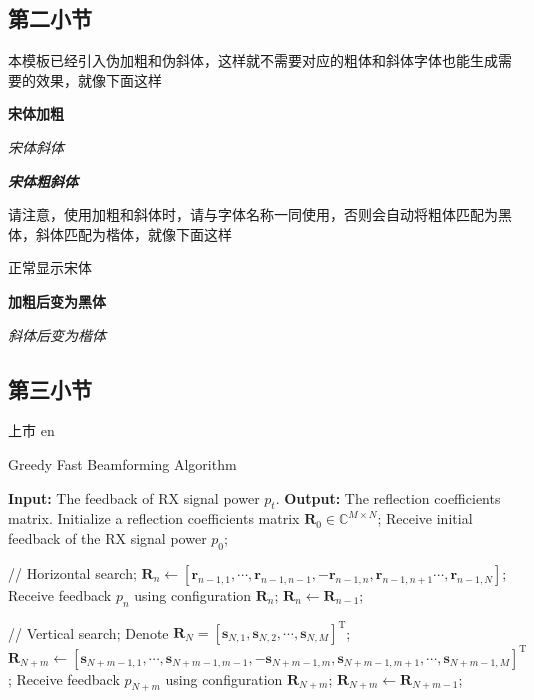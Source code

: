 \documentclass[supercite]{HustGraduPaper}
\begin{document}
	\subsection{第二小节}
	本模板已经引入伪加粗和伪斜体，这样就不需要对应的粗体和斜体字体也能生成需要的效果，就像下面这样
	
	{\songti \bfseries 宋体加粗}
	
	{\songti \itshape 宋体斜体}
	
	{\songti \bfseries \itshape 宋体粗斜体}
	
	请注意，使用加粗和斜体时，请与字体名称一同使用，否则会自动将粗体匹配为黑体，斜体匹配为楷体，就像下面这样
	
	{正常显示宋体}
	
	{\bfseries 加粗后变为黑体}
	
	{\itshape 斜体后变为楷体}
	
	\subsection{第三小节}
	
	
	上市
	en 
	\begin{algorithm}
		\caption{Greedy Fast Beamforming Algorithm}
		\label{alg:GreedyAlgorithm}
		\begin{algorithmic}[1]
			\STATE \textbf{Input: } The feedback of RX signal power $p_t$.
			\STATE \textbf{Output: } The reflection coefficients matrix.
			\STATE Initialize a reflection coefficients matrix $ \mathbf{R}_0\in \mathbb{C}^{M \times N }$;
			\STATE Receive initial feedback of the RX signal power $ p_0 $;
			
			\STATE // Horizontal search;
			\STATE  $ \mathbf{R}_{n} \leftarrow [\mathbf{r}_{n-1,1},\cdots,\mathbf{r}_{n-1,n-1},- \mathbf{r}_{n-1,n}, \mathbf{r}_{n-1,n+1}\cdots,\mathbf{r}_{n-1,N}] $;
			\STATE Receive feedback $ p_{n} $ using configuration $ \mathbf{R}_{n}$;
			\STATE $ \mathbf{R}_{n} \leftarrow \mathbf{R}_{n-1}$;
			\ENDIF
			\ENDFOR
			
			\STATE // Vertical search;
			\STATE Denote $ \mathbf{R}_{N} =[\mathbf{s}_{N,1},\mathbf{s}_{N,2},\cdots,\mathbf{s}_{N,M}]^\mathrm{T}$;
			\small
			\STATE  $\mathbf{R}_{N+m} \leftarrow [\mathbf{s}_{N+m-1,1},\cdots,\mathbf{s}_{N+m-1,m-1},- \mathbf{s}_{N+m-1,m}, \mathbf{s}_{N+m-1,m+1}, \cdots, \mathbf{s}_{N+m-1,M}]^\mathrm{T}$;
			\normalsize
			\STATE Receive feedback $ p_{N+m} $ using configuration $\mathbf{R}_{N+m}$;
			\STATE $ \mathbf{R}_{N+m} \leftarrow \mathbf{R}_{N+m-1}$;
			\ENDIF
			\ENDFOR
		\end{algorithmic}
	\end{algorithm}
	
\end{document}
